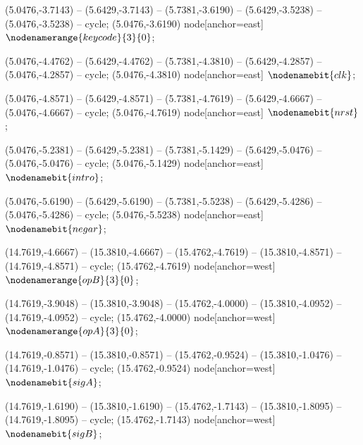    (5.0476,-3.7143) -- (5.6429,-3.7143) -- (5.7381,-3.6190) -- (5.6429,-3.5238) -- (5.0476,-3.5238) -- cycle;
   (5.0476,-3.6190) node[anchor=east] {$\nodenamerange{keycode}{3}{0}$};

   (5.0476,-4.4762) -- (5.6429,-4.4762) -- (5.7381,-4.3810) -- (5.6429,-4.2857) -- (5.0476,-4.2857) -- cycle;
   (5.0476,-4.3810) node[anchor=east] {$\nodenamebit{clk}$};

   (5.0476,-4.8571) -- (5.6429,-4.8571) -- (5.7381,-4.7619) -- (5.6429,-4.6667) -- (5.0476,-4.6667) -- cycle;
   (5.0476,-4.7619) node[anchor=east] {$\nodenamebit{nrst}$};

   (5.0476,-5.2381) -- (5.6429,-5.2381) -- (5.7381,-5.1429) -- (5.6429,-5.0476) -- (5.0476,-5.0476) -- cycle;
   (5.0476,-5.1429) node[anchor=east] {$\nodenamebit{intro}$};

   (5.0476,-5.6190) -- (5.6429,-5.6190) -- (5.7381,-5.5238) -- (5.6429,-5.4286) -- (5.0476,-5.4286) -- cycle;
   (5.0476,-5.5238) node[anchor=east] {$\nodenamebit{negar}$};

   (14.7619,-4.6667) -- (15.3810,-4.6667) -- (15.4762,-4.7619) -- (15.3810,-4.8571) -- (14.7619,-4.8571) -- cycle;
   (15.4762,-4.7619) node[anchor=west] {$\nodenamerange{opB}{3}{0}$};

   (14.7619,-3.9048) -- (15.3810,-3.9048) -- (15.4762,-4.0000) -- (15.3810,-4.0952) -- (14.7619,-4.0952) -- cycle;
   (15.4762,-4.0000) node[anchor=west] {$\nodenamerange{opA}{3}{0}$};

   (14.7619,-0.8571) -- (15.3810,-0.8571) -- (15.4762,-0.9524) -- (15.3810,-1.0476) -- (14.7619,-1.0476) -- cycle;
   (15.4762,-0.9524) node[anchor=west] {$\nodenamebit{sigA}$};

   (14.7619,-1.6190) -- (15.3810,-1.6190) -- (15.4762,-1.7143) -- (15.3810,-1.8095) -- (14.7619,-1.8095) -- cycle;
   (15.4762,-1.7143) node[anchor=west] {$\nodenamebit{sigB}$};

